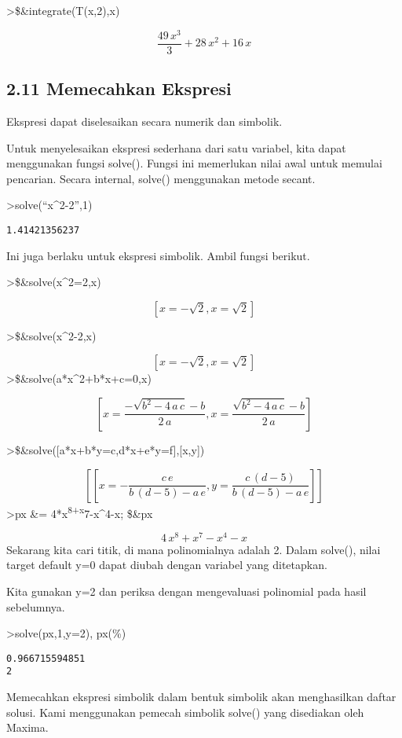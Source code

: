 \documentclass[
]{book}
\begin{document}
\textgreater\$\&integrate(T(x,2),x)

\[\frac{49\,x^3}{3}+28\,x^2+16\,x\] 

\subsection{2.11 Memecahkan Ekspresi}

Ekspresi dapat diselesaikan secara numerik dan simbolik.

Untuk menyelesaikan ekspresi sederhana dari satu variabel, kita dapat menggunakan fungsi solve(). Fungsi ini memerlukan nilai awal untuk memulai pencarian. Secara internal, solve() menggunakan metode secant.

\textgreater solve(``x\^{}2-2'',1)

\begin{verbatim}
1.41421356237
\end{verbatim}

Ini juga berlaku untuk ekspresi simbolik. Ambil fungsi berikut.

\textgreater\$\&solve(x\^{}2=2,x)

\[\left[ x=-\sqrt{2} , x=\sqrt{2} \right]\]

\textgreater\$\&solve(x\^{}2-2,x)

\[\left[ x=-\sqrt{2} , x=\sqrt{2} \right]\]\textgreater\$\&solve(a*x\^{}2+b*x+c=0,x)

\[\left[ x=\frac{-\sqrt{b^2-4\,a\,c}-b}{2\,a} , x=\frac{\sqrt{b^2-4\,a\,c}-b}{2\,a} \right]\]

\textgreater\$\&solve({[}a*x+b*y=c,d*x+e*y=f{]},{[}x,y{]})

\[\left[ \left[ x=-\frac{c\,e}{b\,\left(d-5\right)-a\,e} , y=\frac{c\,\left(d-5\right)}{b\,\left(d-5\right)-a\,e} \right]  \right]\] \textgreater px \&= 4*x\textsuperscript{8+x}7-x\^{}4-x; \$\&px

\[4\,x^8+x^7-x^4-x\]Sekarang kita cari titik, di mana polinomialnya adalah 2. Dalam solve(), nilai target default y=0 dapat diubah dengan variabel yang ditetapkan.

Kita gunakan y=2 dan periksa dengan mengevaluasi polinomial pada hasil sebelumnya.

\textgreater solve(px,1,y=2), px(\%)

\begin{verbatim}
0.966715594851
2
\end{verbatim}

Memecahkan ekspresi simbolik dalam bentuk simbolik akan menghasilkan daftar solusi. Kami menggunakan pemecah simbolik solve() yang disediakan oleh Maxima.
\end{document}
